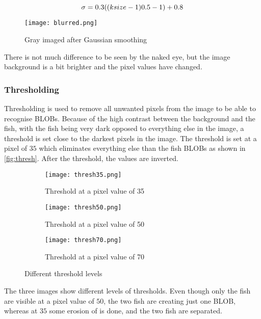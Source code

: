 \begin{equation}
	\sigma = 0.3\*((ksize-1)\*0.5 - 1) + 0.8
\end{equation}

\begin{figure}[H]
	\centering
	\texttt{[image: blurred.png]}
	\caption{Gray imaged after Gaussian smoothing}
	\label{fig:blurred}
\end{figure}

There is not much difference to be seen by the naked eye, but the image background is a bit brighter and the pixel values have changed.

\subsubsection{Thresholding}
Thresholding is used to remove all unwanted pixels from the image to be able to recognise BLOBs. Because of the high contrast between the background and the fish, with the fish being very dark opposed to everything else in the image, a threshold is set close to the darkest pixels in the image.
The threshold is set at a pixel of $35$ which eliminates everything else than the fish BLOBs as shown in \autoref{fig:thresh}. After the threshold, the values are inverted.

\begin{figure}[H]
	\centering
	\begin{subfigure}[b]{0.3\textwidth}
		\texttt{[image: thresh35.png]}
		\caption{Threshold at a pixel value of 35}
		\label{fig:thresh35}
	\end{subfigure}
	\begin{subfigure}[b]{0.3\textwidth}
		\texttt{[image: thresh50.png]}
		\caption{Threshold at a pixel value of 50}
		\label{fig:thresh50}
	\end{subfigure}
	\begin{subfigure}[b]{0.3\textwidth}
		\texttt{[image: thresh70.png]}
		\caption{Threshold at a pixel value of 70}
		\label{fig:thresh70}
	\end{subfigure}
	\caption{Different threshold levels}
	\label{fig:thresh}
\end{figure}

The three images show different levels of thresholds. Even though only the fish are visible at a pixel value of $50$, the two fish are creating just one BLOB, whereas at $35$ some erosion of is done, and the two fish are separated.

